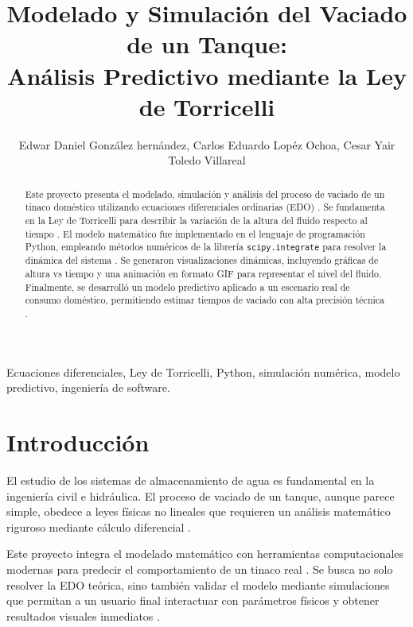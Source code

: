\documentclass{cys}
\title{Modelado y Simulación del Vaciado de un Tanque: \\ Análisis Predictivo mediante la Ley de Torricelli}
\author{Edwar Daniel González hernández, Carlos Eduardo Lopéz Ochoa, Cesar Yair Toledo Villareal}
\affil{ 
	Universidad Politécnica de Chiapas, Ingeniería en Software, Suchiapa, México 
	
	\authorcr  
	243684, 243717, 243739
}
\begin{document}
	
	\maketitle
	
	\renewcommand{\tablename}{Tabla}
	
	\begin{abstract}
		Este proyecto presenta el modelado, simulación y análisis del proceso de vaciado de un tinaco doméstico utilizando ecuaciones diferenciales ordinarias (EDO) \cite{guiaProyecto2026}. Se fundamenta en la Ley de Torricelli para describir la variación de la altura del fluido respecto al tiempo \cite{torricelli2026}. El modelo matemático fue implementado en el lenguaje de programación Python, empleando métodos numéricos de la librería \texttt{scipy.integrate} para resolver la dinámica del sistema \cite{scipy2026}. Se generaron visualizaciones dinámicas, incluyendo gráficas de altura vs tiempo y una animación en formato GIF para representar el nivel del fluido. Finalmente, se desarrolló un modelo predictivo aplicado a un escenario real de consumo doméstico, permitiendo estimar tiempos de vaciado con alta precisión técnica \cite{upchiapas2026}.
	\end{abstract}
	
	\begin{keywords} 
		Ecuaciones diferenciales, Ley de Torricelli, Python, simulación numérica, modelo predictivo, ingeniería de software.
	\end{keywords} 
	
	
	\section{Introducción}
	\label{sec:introduction}
	El estudio de los sistemas de almacenamiento de agua es fundamental en la ingeniería civil e hidráulica. El proceso de vaciado de un tanque, aunque parece simple, obedece a leyes físicas no lineales que requieren un análisis matemático riguroso mediante cálculo diferencial \cite{torricelli2026}. 
	
	Este proyecto integra el modelado matemático con herramientas computacionales modernas para predecir el comportamiento de un tinaco real \cite{guiaProyecto2026}. Se busca no solo resolver la EDO teórica, sino también validar el modelo mediante simulaciones que permitan a un usuario final interactuar con parámetros físicos y obtener resultados visuales inmediatos \cite{upchiapas2026}.
	
\end{document}
